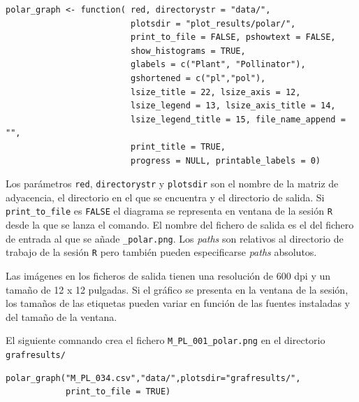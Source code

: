 \fontsize{3.5mm}{3.5mm}\selectfont
\begin{verbatim}
polar_graph <- function( red, directorystr = "data/", 
                         plotsdir = "plot_results/polar/", 
                         print_to_file = FALSE, pshowtext = FALSE,
                         show_histograms = TRUE, 
                         glabels = c("Plant", "Pollinator"),
                         gshortened = c("pl","pol"),
                         lsize_title = 22, lsize_axis = 12, 
                         lsize_legend = 13, lsize_axis_title = 14, 
                         lsize_legend_title = 15, file_name_append = "",
                         print_title = TRUE,
                         progress = NULL, printable_labels = 0)
\end{verbatim}
\normalsize

Los parámetros \texttt{red}, \texttt{directorystr} y \texttt{plotsdir} son el nombre de la matriz de adyacencia, el directorio en el que se encuentra y el directorio de salida. Si \texttt{print\_to\_file} es \texttt{FALSE} el diagrama se representa en ventana de la sesión \texttt{R} desde la que se lanza el comando. El nombre del fichero de salida es el del fichero de entrada al que se añade \texttt{\_polar.png}. Los \textit{paths} son relativos al directorio de trabajo de la sesión \texttt{R} pero también pueden especificarse \textit{paths} absolutos.

Las imágenes en los ficheros de salida tienen una resolución de 600 dpi y un tamaño de 12 x 12 pulgadas. Si el gráfico se presenta en la ventana de la sesión, los tamaños de las etiquetas pueden variar en función de las fuentes instaladas y del tamaño de la ventana.

El siguiente comnando crea el fichero \texttt{M\_PL\_001\_polar.png} en el directorio \texttt{grafresults/}

\fontsize{3.5mm}{3.5mm}\selectfont
\begin{verbatim}
polar_graph("M_PL_034.csv","data/",plotsdir="grafresults/",
            print_to_file = TRUE)
\end{verbatim}
\normalsize

